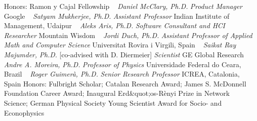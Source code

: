     \newline
    {\footnotesize Honors: Ramon y Cajal Fellowship}
    \newline
~
\Gap{}
\textit{Daniel McClary, Ph.D.}
\newline
    \textit{Product Manager}
    \newline
    Google
    \newline
~
\Gap{}
\textit{Satyam Mukherjee, Ph.D.}
\newline
    \textit{Assistant Professor}
    \newline
    Indian Institute of Management, Udaipur
    \newline
~
\Gap{}
\textit{Aleks Aris, Ph.D.}
\newline
    \textit{Software Consultant and HCI Researcher}
    \newline
    Mountain Wisdom
    \newline
~
\Gap{}
\textit{Jordi Duch, Ph.D.}
\newline
    \textit{Assistant Professor of Applied Math and Computer Science}
    \newline
    Universitat Rovira i Virgili, Spain
    \newline
~
\Gap{}
\textit{Saikat Ray Majumder, Ph.D.}
    [co-advised with D. Diermeier]
\newline
    \textit{Scientist}
    \newline
    GE Global Research
    \newline
~
\Gap{}
\textit{Andre A. Moreira, Ph.D.}
\newline
    \textit{Professor of Physics}
    \newline
    Universidade Federal do Ceara, Brazil
    \newline
~
\Gap{}
\textit{Roger Guimer\`a, Ph.D.}
\newline
    \textit{Senior Research Professor}
    \newline
    ICREA, Catalonia, Spain
    \newline
    {\footnotesize Honors: Fulbright Scholar; Catalan Research Award; James S. McDonnell Foundation Career Award;  Inaugural Erd\&quot;os-R\`enyi Prize in Network Science; German Physical Society Young Scientist Award for Socio- and Econophysics}
    \newline
